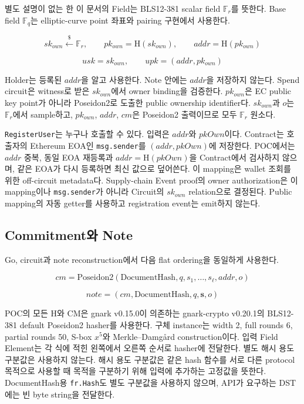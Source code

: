 \documentclass[11pt,a4paper]{extarticle}
\newcommand{\Hash}{\mathrm{H}}
\newcommand{\Poseidon}{\mathrm{Poseidon2}}
\newcommand{\CM}{\mathrm{CM}}
\newcommand{\DocumentHash}{\mathrm{DocumentHash}}
\begin{document}
별도 설명이 없는 한 이 문서의 Field는 BLS12-381 scalar field
$\mathbb{F}_r$를 뜻한다. Base field $\mathbb{F}_q$는 elliptic-curve point 좌표와
pairing 구현에서 사용한다.

\[
sk_{own}\xleftarrow{\$}\mathbb{F}_r,
\qquad
pk_{own}=\Hash(sk_{own}),
\qquad
addr=\Hash(pk_{own})
\]

\[
usk=sk_{own},
\qquad
upk=(addr,pk_{own})
\]

Holder는 등록된 $addr$을 알고 사용한다. Note 안에는 $addr$을 저장하지 않는다.
Spend circuit은 witness로 받은 $sk_{own}$에서 owner binding을 검증한다.
$pk_{own}$은 EC public key point가 아니라 Poseidon2로 도출한 public ownership
identifier다. $sk_{own}$과 $o$는 $\mathbb{F}_r$에서 sample하고,
$pk_{own}$, $addr$, $cm$은 Poseidon2 출력이므로 모두 $\mathbb{F}_r$ 원소다.

\texttt{RegisterUser}는 누구나 호출할 수 있다. 입력은 $addr$와 $pkOwn$이다.
Contract는 호출자의 Ethereum EOA인 \texttt{msg.sender}를 $(addr,pkOwn)$에 저장한다. POC에서는
$addr$ 중복, 동일 EOA 재등록과 $addr=\Hash(pkOwn)$을 Contract에서 검사하지 않으며,
같은 EOA가 다시 등록하면 최신 값으로 덮어쓴다. 이 mapping은 wallet 조회를 위한
off-circuit metadata다. Supply-chain Event proof의 owner authorization은 이 mapping이나
\texttt{msg.sender}가 아니라 Circuit의 $sk_{own}$ relation으로 결정된다. Public mapping의
자동 getter를 사용하고 registration event는 emit하지 않는다.

\subsection{Commitment와 Note}

Go, circuit과 note reconstruction에서 다음 flat ordering을 동일하게 사용한다.

\[
cm=\Poseidon(
\DocumentHash,q,s_1,\ldots,s_{\ell},addr,o
)
\]

\[
\mathit{note}=(cm,\DocumentHash,q,\mathbf{s},o)
\]

POC의 모든 $\Hash$와 $\CM$은 gnark v0.15.0이 의존하는 gnark-crypto v0.20.1의
BLS12-381 default Poseidon2 hasher를 사용한다. 구체 instance는 width 2,
full rounds 6, partial rounds 50, S-box $x^5$와 Merkle--Damg\aa rd construction이다.
입력 Field Element는 각 식에 적힌 왼쪽에서 오른쪽 순서로 hasher에 전달한다. 별도
해시 용도 구분값은 사용하지 않는다. 해시 용도 구분값은 같은 hash 함수를 서로 다른
protocol 목적으로 사용할 때 목적을 구분하기 위해 입력에 추가하는 고정값을 뜻한다.
DocumentHash용 \texttt{fr.Hash}도 별도 구분값을 사용하지 않으며, API가 요구하는
DST에는 빈 byte string을 전달한다.
\end{document}
